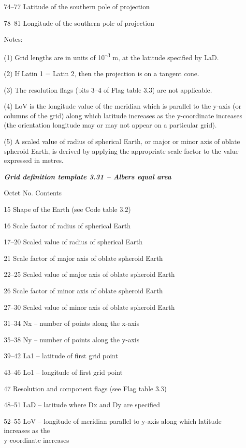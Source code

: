 74--77 Latitude of the southern pole of projection

78--81 Longitude of the southern pole of projection

Notes:

(1) Grid lengths are in units of 10\textsuperscript{--3} m, at the latitude specified by LaD.

(2) If Latin 1 = Latin 2, then the projection is on a tangent cone.

(3) The resolution flags (bits 3--4 of Flag table 3.3) are not applicable.

(4) LoV is the longitude value of the meridian which is parallel to the y-axis (or columns of the grid) along which latitude increases as the y-coordinate increases (the orientation longitude may or may not appear on a particular grid).

(5) A scaled value of radius of spherical Earth, or major or minor axis of oblate spheroid Earth, is derived by applying the appropriate scale factor to the value expressed in metres.

\emph{\textbf{Grid definition template 3.31 -- Albers equal area}}

Octet No. Contents

15 Shape of the Earth (see Code table 3.2)

16 Scale factor of radius of spherical Earth

17--20 Scaled value of radius of spherical Earth

21 Scale factor of major axis of oblate spheroid Earth

22--25 Scaled value of major axis of oblate spheroid Earth

26 Scale factor of minor axis of oblate spheroid Earth

27--30 Scaled value of minor axis of oblate spheroid Earth

31--34 Nx -- number of points along the x-axis

35--38 Ny -- number of points along the y-axis

39--42 La1 -- latitude of first grid point

43--46 Lo1 -- longitude of first grid point

47 Resolution and component flags (see Flag table 3.3)

48--51 LaD -- latitude where Dx and Dy are specified

52--55 LoV -- longitude of meridian parallel to y-axis along which latitude increases as the\\
y-coordinate increases

